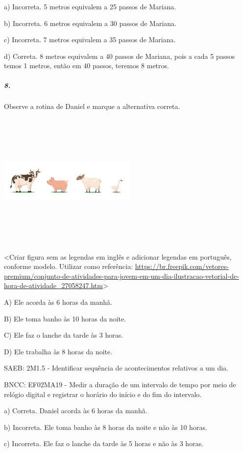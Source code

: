 a) Incorreta. 5 metros equivalem a 25 passos de Mariana.

b) Incorreta. 6 metros equivalem a 30 passos de Mariana.

c) Incorreta. 7 metros equivalem a 35 passos de Mariana.

d) Correta. 8 metros equivalem a 40 passos de Mariana, pois a cada 5
passos temos 1 metros, então em 40 passos, teremos 8 metros.

\subparagraph{8. }\label{section-107}

Observe a rotina de Daniel e marque a alternativa correta.

\includegraphics[width=2.66667in,height=2.65556in]{media/image116.png}

\textless{}Criar figura sem as legendas em inglês e adicionar legendas
em português, conforme modelo. Utilizar como referência:
\url{https://br.freepik.com/vetores-premium/conjunto-de-atividades-para-jovem-em-um-dia-ilustracao-vetorial-de-hora-de-atividade_27058247.htm}\textgreater{}

A) Ele acorda às 6 horas da manhã.

B) Ele toma banho às 10 horas da noite.

C) Ele faz o lanche da tarde às 3 horas.

D) Ele trabalha às 8 horas da noite.

SAEB: 2M1.5 - Identificar sequência de acontecimentos relativos a um
dia.

BNCC: EF02MA19 - Medir a duração de um intervalo de tempo por meio de
relógio digital e registrar o horário do início e do fim do intervalo.

a) Correta. Daniel acorda às 6 horas da manhã.

b) Incorreta. Ele toma banho às 8 horas da noite e não às 10 horas.

c) Incorreta. Ele faz o lanche da tarde às 5 horas e não às 3 horas.

